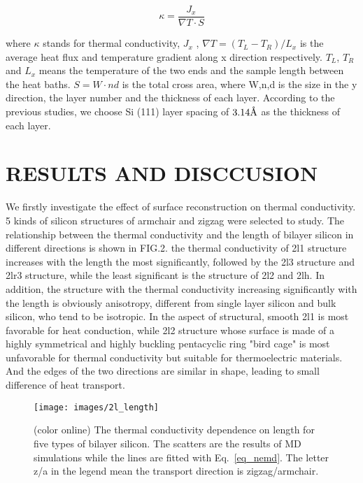 \documentclass[%
 reprint,
 amsmath,amssymb,
 aps,
prb,
]{revtex4-1}
\newcommand{\angstrom}{\mbox{\normalfont\AA}}
\begin{document}
\begin{equation}
\kappa = \frac{ J_x}{ \nabla T \cdot S} \label{eq_nemd}
\end{equation}

where $\kappa$ stands for thermal conductivity, $J_x$ , $\nabla T=(T_L-T_R)/L_x$ is the average heat flux and temperature gradient along x direction respectively. $T_L$, $T_R$ and $L_x$ means the temperature of the two ends and the sample length between the heat baths. $S=W \cdot nd$ is the total cross area, where W,n,d is the size in the y direction, the layer number and the thickness of each layer. According to the previous studies, we choose Si (111) layer spacing of $3.14 \angstrom$ as the thickness of each layer.



\section{RESULTS AND DISCCUSION}

We firstly investigate the effect of surface reconstruction on thermal conductivity. 5 kinds of silicon structures of armchair and zigzag were selected to study. The relationship between the thermal conductivity and the length of bilayer silicon in different directions is shown in FIG.2. the thermal conductivity of 2l1 structure increases with the length the most significantly, followed by the 2l3 structure and 2lr3 structure, while the least significant is the structure of 2l2 and 2lh. In addition, the structure with the thermal conductivity increasing significantly with the length is obviously anisotropy, different from single layer silicon and bulk silicon, who tend to be isotropic. In the aspect of structural, smooth 2l1 is most favorable for heat conduction, while 2l2 structure whose surface is made of a highly symmetrical and highly buckling pentacyclic ring "bird cage" is most unfavorable for thermal conductivity but suitable for thermoelectric materials. And the edges of the two directions are similar in shape, leading to small difference of heat transport.

\begin{figure}[b]
\texttt{[image: images/2l\_length]}
\caption{\label{fig:2l_length} (color online) The thermal conductivity dependence on length for five types of bilayer silicon. The scatters are the results of MD simulations while the lines are fitted with Eq.~\ref{eq_nemd}. The letter z/a in the legend mean the transport direction is zigzag/armchair.}
\end{figure}
\end{document}
